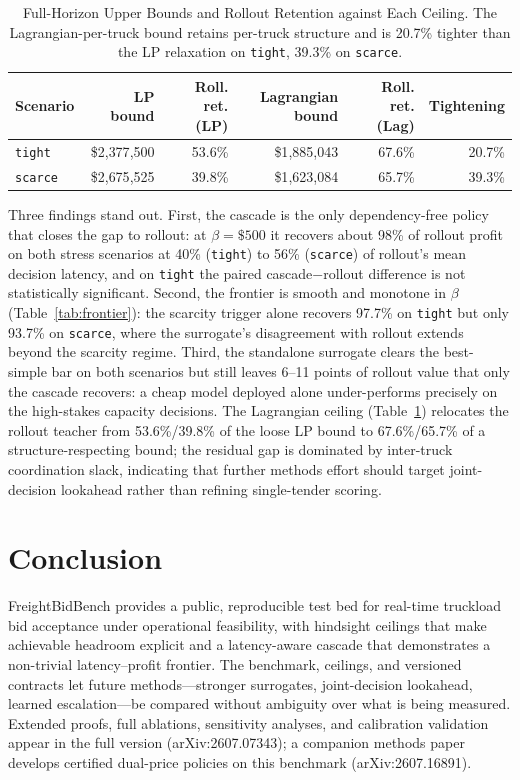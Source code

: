 \documentclass[numbered]{trbunofficial}
\begin{document}
\begin{table}[t]
\caption{Full-Horizon Upper Bounds and Rollout Retention against Each
Ceiling. The Lagrangian-per-truck bound retains per-truck structure and is
20.7\% tighter than the LP relaxation on \texttt{tight}, 39.3\% on
\texttt{scarce}.}
\label{tab:bound}
\centering\small
\begin{tabular}{lrrrrr}
\toprule
Scenario & LP bound & Roll. ret. (LP) & Lagrangian bound & Roll. ret. (Lag) & Tightening \\
\midrule
\texttt{tight}  & \$2{,}377{,}500 & 53.6\% & \$1{,}885{,}043 & 67.6\% & 20.7\% \\
\texttt{scarce} & \$2{,}675{,}525 & 39.8\% & \$1{,}623{,}084 & 65.7\% & 39.3\% \\
\bottomrule
\end{tabular}
\end{table}

Three findings stand out. First, the cascade is the only dependency-free
policy that closes the gap to rollout: at $\beta=\$500$ it recovers about
98\% of rollout profit on both stress scenarios at 40\% (\texttt{tight}) to
56\% (\texttt{scarce}) of rollout's mean decision latency, and on
\texttt{tight} the paired cascade$-$rollout difference is not statistically
significant. Second, the frontier is smooth and monotone in $\beta$
(Table~\ref{tab:frontier}): the scarcity trigger alone recovers 97.7\% on
\texttt{tight} but only 93.7\% on \texttt{scarce}, where the surrogate's
disagreement with rollout extends beyond the scarcity regime. Third, the
standalone surrogate clears the best-simple bar on both scenarios but still
leaves 6--11 points of rollout value that only the cascade recovers: a
cheap model deployed alone under-performs precisely on the high-stakes
capacity decisions. The Lagrangian ceiling (Table~\ref{tab:bound})
relocates the rollout teacher from 53.6\%/39.8\% of the loose LP bound to
67.6\%/65.7\% of a structure-respecting bound; the residual gap is
dominated by inter-truck coordination slack, indicating that further
methods effort should target joint-decision lookahead rather than refining
single-tender scoring.

\section{Conclusion}
FreightBidBench provides a public, reproducible test bed for real-time
truckload bid acceptance under operational feasibility, with hindsight
ceilings that make achievable headroom explicit and a latency-aware cascade
that demonstrates a non-trivial latency--profit frontier. The benchmark,
ceilings, and versioned contracts let future methods---stronger surrogates,
joint-decision lookahead, learned escalation---be compared without
ambiguity over what is being measured. Extended proofs, full ablations,
sensitivity analyses, and calibration validation appear in the full
version (arXiv:2607.07343); a companion methods paper develops
certified dual-price policies on this benchmark (arXiv:2607.16891).
\end{document}
